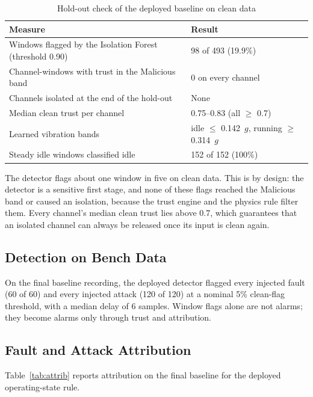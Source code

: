 \begin{table}[htbp]
\centering
\caption{Hold-out check of the deployed baseline on clean data}
\label{tab:holdout}
\small
\begin{tabularx}{\textwidth}{@{}X l@{}}
\toprule
\textbf{Measure} & \textbf{Result} \\
\midrule
Windows flagged by the Isolation Forest (threshold 0.90) & 98 of 493 (19.9\%) \\
Channel-windows with trust in the Malicious band & 0 on every channel \\
Channels isolated at the end of the hold-out & None \\
Median clean trust per channel & 0.75--0.83 (all $\geq$ 0.7) \\
Learned vibration bands & idle $\leq$ 0.142~$g$, running $\geq$ 0.314~$g$ \\
Steady idle windows classified idle & 152 of 152 (100\%) \\
\bottomrule
\end{tabularx}
\end{table}

The detector flags about one window in five on clean data. This is by design: the detector is a sensitive first stage, and none of these flags reached the Malicious band or caused an isolation, because the trust engine and the physics rule filter them. Every channel's median clean trust lies above 0.7, which guarantees that an isolated channel can always be released once its input is clean again.

\subsection{Detection on Bench Data}

On the final baseline recording, the deployed detector flagged every injected fault (60 of 60) and every injected attack (120 of 120) at a nominal 5\% clean-flag threshold, with a median delay of 6 samples. Window flags alone are not alarms; they become alarms only through trust and attribution.

\subsection{Fault and Attack Attribution}

Table~\ref{tab:attrib} reports attribution on the final baseline for the deployed operating-state rule.

